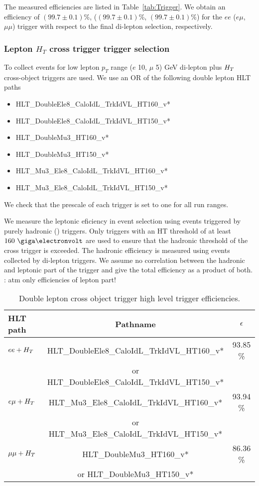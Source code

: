 The measured efficiencies are listed in Table~\ref{tab:Trigger}. 
We obtain an efficiency of $(99.7\pm0.1)$\%, ($(99.7\pm0.1)$\%, $(99.7\pm0.1)$\%) 
for the $ee$ ($e\mu$, $\mu\mu$) trigger with respect to the final 
di-lepton selection, respectively.

\subsubsection{Lepton $H_T$ cross trigger trigger selection}
To collect events for low lepton $p_T$ range ($e$ 10, $\mu$ 5) GeV di-lepton plus
$H_T~$ cross-object triggers are used.
We use an OR of the following double lepton \HT HLT paths
\begin{itemize}
\item HLT\_DoubleEle8\_CaloIdL\_TrkIdVL\_HT160\_v* 
\item HLT\_DoubleEle8\_CaloIdL\_TrkIdVL\_HT150\_v* 
\item HLT\_DoubleMu3\_HT160\_v* 
\item HLT\_DoubleMu3\_HT150\_v* 
\item HLT\_Mu3\_Ele8\_CaloIdL\_TrkIdVL\_HT160\_v* 
\item HLT\_Mu3\_Ele8\_CaloIdL\_TrkIdVL\_HT150\_v*
\end{itemize}
We check that the prescale of each trigger is set to one
for all run ranges.

We measure the leptonic eficiency in event selection
using events triggered by purely hadronic (\HT) triggers. Only triggers with an HT threshold of at least $160~\GeV$ are used to ensure that the hadronic threshold of the cross trigger is exceeded.
The hadronic efficiency is measured using
events collected by di-lepton triggers. We assume
no correlation between the hadronic and leptonic
part of the trigger and give the total efficiency
as a product of both.\\
\TODO: atm only efficiencies of lepton part!

\begin{table}[hbtp]
\caption{Double lepton \HT cross object trigger high level trigger efficiencies. \label{tab:TriggerHT}}
\begin{center}
\begin{tabular}{|l||c|c|} \hline
HLT path    &   Pathname        & $\epsilon$\\\hline \hline
$ee + H_T~$ &  HLT\_DoubleEle8\_CaloIdL\_TrkIdVL\_HT160\_v* & 93.85 \%\\
 & or HLT\_DoubleEle8\_CaloIdL\_TrkIdVL\_HT150\_v* & \\\hline
$e\mu + H_T~$& HLT\_Mu3\_Ele8\_CaloIdL\_TrkIdVL\_HT160\_v*  & 93.94 \%\\
 & or HLT\_Mu3\_Ele8\_CaloIdL\_TrkIdVL\_HT150\_v* & \\\hline
$\mu\mu + H_T~$& HLT\_DoubleMu3\_HT160\_v* & 86.36 \%\\
 & or HLT\_DoubleMu3\_HT150\_v* & \\\hline
\end{tabular}
\end{center}
\end{table}


